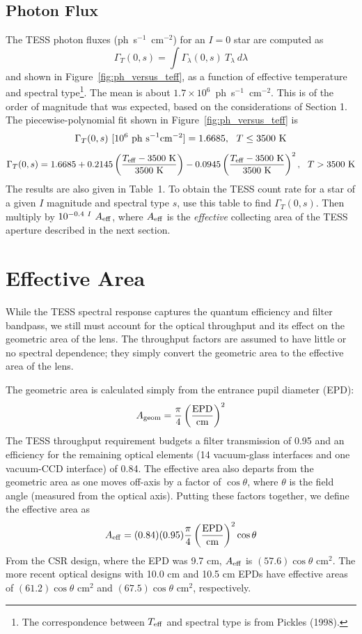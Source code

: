 \documentclass[preprint,10pt]{aastex}
\newcommand{\be}{\begin{displaymath}}
\newcommand{\ee}{\end{displaymath}}
\begin{document}
\subsection{Photon Flux}
\label{sec:results}
The TESS photon fluxes (ph~s$^{-1}$~cm$^{-2}$) for an $I=0$ star are
computed as
\be
\Gamma_T(0,s) = \int \Gamma_\lambda(0,s)~T_\lambda~d\lambda
\ee
and shown in Figure~\ref{fig:ph_versus_teff}, as a function of 
effective temperature and spectral type\footnote{The correspondence
between $T_{\rm eff}$ and spectral type is from Pickles (1998).}. The mean is about $1.7\times
10^6$~ph~s$^{-1}$~cm$^{-2}$. This is of the order of magnitude
that was expected, based on the considerations of Section 1.
The piecewise-polynomial fit shown in Figure~\ref{fig:ph_versus_teff} is
\be
\Gamma_T(0,s)~[10^6~{\rm ph~s}^{-1}{\rm cm}^{-2}] = 1.6685, ~~ T \le 3500~{\rm K} 
\ee
\be
\Gamma_T(0,s) = 1.6685 + 
0.2145 \left( \frac{T_{\rm eff} - 3500~{\rm K}}{3500~{\rm K}} \right)
-0.0945 \left( \frac{T_{\rm eff} - 3500~{\rm K}}{3500~{\rm K}} \right)^2, ~~ T > 3500~{\rm K}
\ee
The results are also given in Table~1.  To obtain the TESS count rate
for a star of a given $I$ magnitude and spectral type $s$, use this
table to find $\Gamma_T(0,s)$.  Then multiply by $10^{-0.4~I}~A_{\rm
  eff}$, where $A_{\rm eff}$ is the {\it effective} collecting area
of the TESS aperture described in the next section.

\section{Effective Area}
\label{sec:aeff}
While the TESS spectral response captures the quantum efficiency and filter bandpass, 
we still must account for the optical throughput and its effect on the geometric area of the lens. The throughput factors are assumed to have little or no spectral dependence; they simply convert the geometric area to the effective area of the lens.

The geometric area is calculated simply from the entrance pupil diameter (EPD):
\be
A_{\rm geom} = \frac{\pi}{4} \left( \frac{\rm EPD} {\rm cm} \right )^2
\ee
The TESS throughput requirement budgets a filter transmission of 0.95 and an efficiency for the remaining optical elements (14 vacuum-glass interfaces and one vacuum-CCD interface) of 0.84. The effective area also departs from the geometric area as one moves off-axis by a factor of $\cos\theta$, 
where $\theta$ is the field angle (measured from the optical axis). Putting these factors together, we define the effective area as
\be
A_{\rm eff} = (0.84)(0.95) \frac{\pi}{4} \left( \frac{\rm EPD} {\rm cm} \right )^2 \cos\theta
\ee
From the CSR design, where the EPD was 9.7 cm, $A_{\rm eff}$ is $(57.6)\cos\theta$ cm$^2$. The more recent optical designs with 10.0 cm and 10.5 cm EPDs have effective areas of $(61.2)\cos\theta$ cm$^2$ and $(67.5)\cos\theta$ cm$^2$, respectively.
\end{document}

